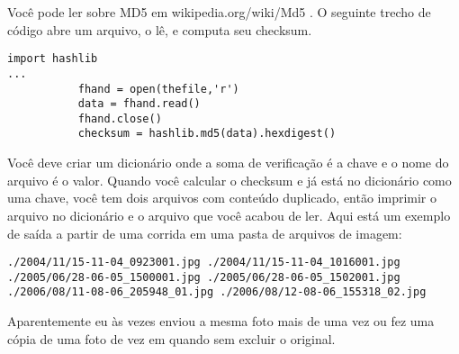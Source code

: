 \documentclass{book}
\begin{document}
Você pode ler sobre MD5 em wikipedia.org/wiki/Md5 . O
seguinte trecho de código abre um arquivo, o lê, e computa
seu checksum.

\begin{verbatim}
import hashlib 
...
           fhand = open(thefile,'r')
           data = fhand.read()
           fhand.close()
           checksum = hashlib.md5(data).hexdigest()
\end{verbatim}
%

Você deve criar um dicionário onde a soma de verificação é a chave
e o nome do arquivo é o valor. Quando você calcular o checksum
e já está no dicionário como uma chave, você tem dois arquivos com
conteúdo duplicado, então imprimir o arquivo no dicionário
e o arquivo que você acabou de ler. Aqui está um exemplo de saída
a partir de uma corrida em uma pasta de arquivos de imagem:

\begin{verbatim}
./2004/11/15-11-04_0923001.jpg ./2004/11/15-11-04_1016001.jpg
./2005/06/28-06-05_1500001.jpg ./2005/06/28-06-05_1502001.jpg
./2006/08/11-08-06_205948_01.jpg ./2006/08/12-08-06_155318_02.jpg
\end{verbatim}
%
Aparentemente eu às vezes enviou a mesma foto mais de uma vez
ou fez uma cópia de uma foto de vez em quando sem excluir
o original.
\end{document}

